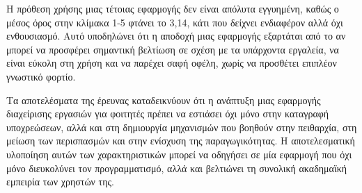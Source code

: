             Η πρόθεση χρήσης μιας τέτοιας εφαρμογής δεν είναι απόλυτα εγγυημένη, καθώς ο μέσος όρος στην κλίμακα 1-5 φτάνει το 3,14, κάτι που δείχνει ενδιαφέρον αλλά όχι ενθουσιασμό. Αυτό υποδηλώνει ότι η αποδοχή μιας εφαρμογής εξαρτάται από το αν μπορεί να προσφέρει σημαντική βελτίωση σε σχέση με τα υπάρχοντα εργαλεία, να είναι εύκολη στη χρήση και να παρέχει σαφή οφέλη, χωρίς να προσθέτει επιπλέον γνωστικό φορτίο.

            Τα αποτελέσματα της έρευνας καταδεικνύουν ότι η ανάπτυξη μιας εφαρμογής διαχείρισης εργασιών για φοιτητές πρέπει να εστιάσει όχι μόνο στην καταγραφή υποχρεώσεων, αλλά και στη δημιουργία μηχανισμών που βοηθούν στην πειθαρχία, στη μείωση των περισπασμών και στην ενίσχυση της παραγωγικότητας. Η αποτελεσματική υλοποίηση αυτών των χαρακτηριστικών μπορεί να οδηγήσει σε μία εφαρμογή που όχι μόνο διευκολύνει τον προγραμματισμό, αλλά και βελτιώνει τη συνολική ακαδημαϊκή εμπειρία των χρηστών της.